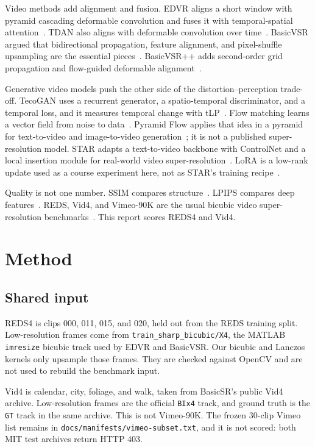 \documentclass[10pt,twocolumn,letterpaper]{article}
\begin{document}
Video methods add alignment and fusion.
EDVR aligns a short window with pyramid cascading deformable convolution and fuses it with temporal-spatial attention~\cite{wang2019edvr}.
TDAN also aligns with deformable convolution over time~\cite{tian2020tdan}.
BasicVSR argued that bidirectional propagation, feature alignment, and pixel-shuffle upsampling are the essential pieces~\cite{chan2021basicvsr}.
BasicVSR++ adds second-order grid propagation and flow-guided deformable alignment~\cite{chan2022basicvsrpp}.

Generative video models push the other side of the distortion--perception trade-off.
TecoGAN uses a recurrent generator, a spatio-temporal discriminator, and a temporal loss, and it measures temporal change with tLP~\cite{chu2020tecogan}.
Flow matching learns a vector field from noise to data~\cite{lipman2023flow}.
Pyramid Flow applies that idea in a pyramid for text-to-video and image-to-video generation~\cite{jin2025pyramid}; it is not a published super-resolution model.
STAR adapts a text-to-video backbone with ControlNet and a local insertion module for real-world video super-resolution~\cite{xie2025star}.
LoRA is a low-rank update used as a course experiment here, not as STAR's training recipe~\cite{hu2022lora}.

Quality is not one number.
SSIM compares structure~\cite{wang2004ssim}.
LPIPS compares deep features~\cite{zhang2018lpips}.
REDS, Vid4, and Vimeo-90K are the usual bicubic video super-resolution benchmarks~\cite{nah2019reds,xue2019vimeo}.
This report scores REDS4 and Vid4.

\section{Method}
\subsection{Shared input}
REDS4 is clips 000, 011, 015, and 020, held out from the REDS training split.
Low-resolution frames come from \texttt{train\_sharp\_bicubic/X4}, the MATLAB \texttt{imresize} bicubic track used by EDVR and BasicVSR.
Our bicubic and Lanczos kernels only upsample those frames.
They are checked against OpenCV and are not used to rebuild the benchmark input.

Vid4 is calendar, city, foliage, and walk, taken from BasicSR's public Vid4 archive.
Low-resolution frames are the official \texttt{BIx4} track, and ground truth is the \texttt{GT} track in the same archive.
This is not Vimeo-90K.
The frozen 30-clip Vimeo list remains in \texttt{docs/manifests/vimeo-subset.txt}, and it is not scored: both MIT test archives return HTTP 403.
\end{document}
